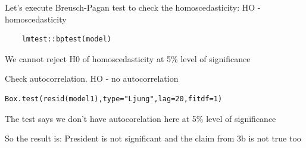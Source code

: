 \documentclass[12pt,a4paper]{article}
\begin{document}
Let's execute Breusch-Pagan test to check the homoscedasticity: HO - homoscedasticity
\begin{verbatim}
	lmtest::bptest(model) 
\end{verbatim}
\begin{center}
\end{center}
We cannot reject H0 of homoscedasticity at 5\% level of significance

Check autocorrelation. HO - no autocorrelation
\begin{verbatim}
Box.test(resid(model1),type="Ljung",lag=20,fitdf=1)
\end{verbatim}
\begin{center}
\end{center}
The test says we don't have autocorelation here at 5\% level of significance

So the result is:
President is not significant and the claim from 3b is  not true too
\end{document}
